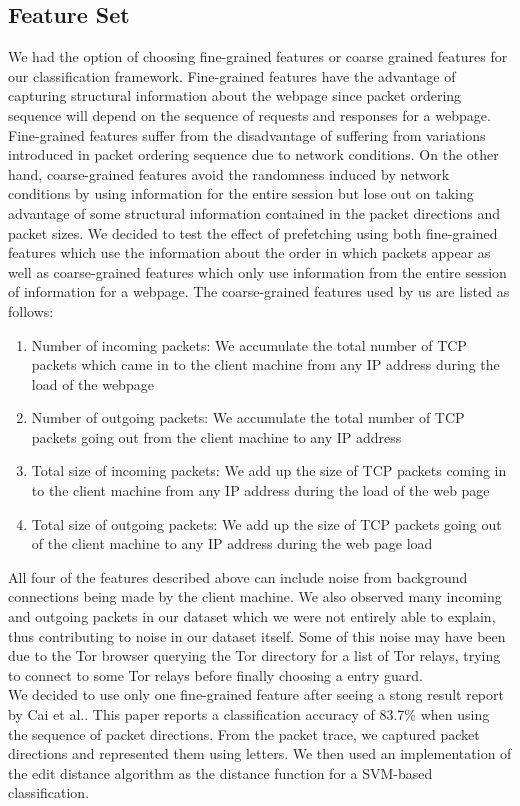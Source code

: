\subsection{Feature Set}
We had the option of choosing fine-grained features or coarse grained features for our classification framework. 
Fine-grained features have the advantage of capturing structural information about the webpage since packet ordering sequence will depend on the sequence of requests and responses for a webpage. 
Fine-grained features suffer from the disadvantage of suffering from variations introduced in packet ordering sequence due to network conditions. 
On the other hand, coarse-grained features avoid the randomness induced by network conditions by using information for the entire session but lose out on taking advantage of some structural information contained in the packet directions and packet sizes.
We decided to test the effect of prefetching using both fine-grained features which use the information about the order in which packets appear as well as coarse-grained features which only use information from the entire session of information for a webpage. The coarse-grained features used by us are listed as follows:
\begin{enumerate}
\item 
Number of incoming packets: We accumulate the total number of TCP packets which came in to the client machine from any IP address during the load of the webpage
\item
Number of outgoing packets: We accumulate the total number of TCP packets going out from the client machine to any IP address
\item 
Total size of incoming packets: We add up the size of TCP packets coming in to the client machine from any IP address during the load of the web page
\item
Total size of outgoing packets: We add up the size of TCP packets going out of the client machine to any IP address during the web page load
\end{enumerate}
All four of the features described above can include noise from background connections being made by the client machine. 
We also observed many incoming and outgoing packets in our dataset which we were not entirely able to explain, thus contributing to noise in our dataset itself. 
Some of this noise may have been due to the Tor browser querying the Tor directory for a list of Tor relays, trying to connect to some Tor relays before finally choosing a entry guard.\\
We decided to use only one fine-grained feature after seeing a stong result report by Cai et al.\cite{cai2012touching}. This paper reports a classification accuracy of 83.7\% when using the sequence of packet directions. From the packet trace, we captured packet directions and represented them using letters. We then used an implementation\cite{edit-distance-matlab} of the edit distance algorithm\cite{edit-distance} as the distance function for a SVM-based classification.



